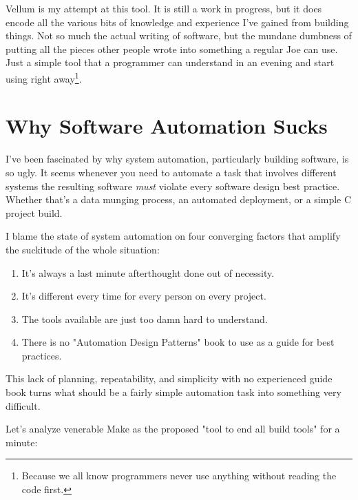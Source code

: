 Vellum is my attempt at this tool.  It is still a work in progress, but it does
encode all the various bits of knowledge and experience I've gained from
building things.  Not so much the actual writing of software, but the mundane
dumbness of putting all the pieces other people wrote into something a regular
Joe can use.  Just a simple tool that a programmer can understand in an evening
and start using right away\footnote{Because we all know programmers never use
    anything without reading the code first.}.




\section{Why Software Automation Sucks}

I've been fascinated by why system automation, particularly building software,
is so ugly.  It seems whenever you need to automate a task that involves
different systems the resulting software \emph{must} violate every software
design best practice.  Whether that's a data munging process, an automated
deployment, or a simple C project build.

I blame the state of system automation on four converging factors that amplify the
suckitude of the whole situation:

\begin{enumerate}
\item It's always a last minute afterthought done out of necessity.
\item It's different every time for every person on every project.
\item The tools available are just too damn hard to understand.
\item There is no "Automation Design Patterns" book to use as a guide for best
practices.
\end{enumerate}

This lack of planning, repeatability, and simplicity with no experienced guide
book turns what should be a fairly simple automation task into something very
difficult.

Let's analyze venerable Make as the proposed "tool to end all build tools" for a
minute:

